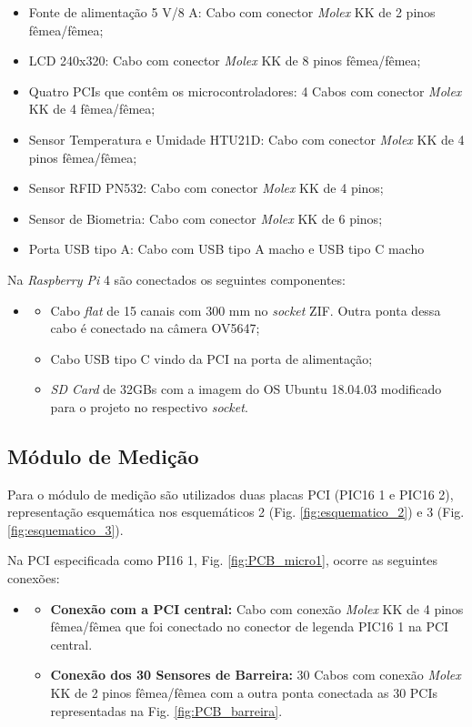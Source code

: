 \begin{itemize}
    \item Fonte de alimentação 5 V/8 A: Cabo com conector \textit{Molex} KK de 2 pinos fêmea/fêmea;
    \item LCD 240x320: Cabo com conector \textit{Molex} KK de 8 pinos fêmea/fêmea;
    \item Quatro PCIs que contêm os microcontroladores: 4 Cabos com conector \textit{Molex} KK de 4 fêmea/fêmea;
    \item Sensor Temperatura e Umidade HTU21D: Cabo com conector \textit{Molex} KK de 4 pinos fêmea/fêmea;
    \item Sensor RFID PN532: Cabo com conector \textit{Molex} KK de 4 pinos;
    \item Sensor de Biometria: Cabo com conector \textit{Molex} KK de 6 pinos;
    \item Porta USB tipo A: Cabo com USB tipo A macho e USB tipo C macho
\end{itemize}


Na \textit{Raspberry Pi} 4 são conectados os seguintes componentes:

\begin{itemize}
    \item[]
    \begin{itemize}
        \item Cabo \textit{flat} de 15 canais com 300 mm no \textit{socket} ZIF. Outra ponta dessa cabo é conectado na câmera OV5647;
        \item Cabo USB tipo C vindo da PCI na porta de alimentação;
        \item \textit{SD Card} de 32GBs com a imagem do OS Ubuntu 18.04.03 modificado para o projeto no respectivo \textit{socket}.
    \end{itemize}
\end{itemize}


\subsection{Módulo de Medição}\label{sec:construcao_modulo_medicao}

Para o módulo de medição são utilizados duas placas PCI (PIC16 1 e PIC16 2), representação esquemática nos esquemáticos 2 (Fig. \ref{fig:esquematico_2}) e 3 (Fig. \ref{fig:esquematico_3}).

Na PCI especificada como PI16 1, Fig. \ref{fig:PCB_micro1}, ocorre as seguintes conexões:

\begin{itemize}
    \item[]
    \begin{itemize}
    \item \textbf{Conexão com a PCI central:} Cabo com conexão \textit{Molex} KK de 4 pinos fêmea/fêmea que foi conectado no conector de legenda PIC16 1 na PCI central.
    \item \textbf{Conexão dos 30 Sensores de Barreira:} 30 Cabos com conexão \textit{Molex} KK de 2 pinos fêmea/fêmea com a outra ponta conectada as 30 PCIs representadas na Fig. \ref{fig:PCB_barreira}.
\end{itemize}
\end{itemize}


